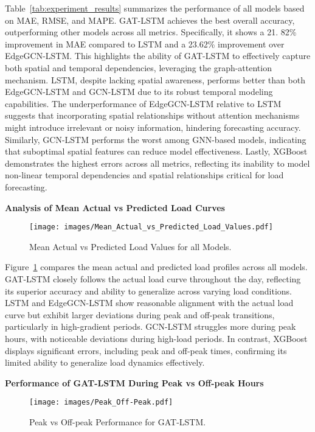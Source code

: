 \documentclass[sigconf,nonacm]{acmart}
\begin{document}
Table~\ref{tab:experiment_results} summarizes the performance of all models based on MAE, RMSE, and MAPE. GAT-LSTM achieves the best overall accuracy, outperforming other models across all metrics. Specifically, it shows a 21. 82\% improvement in MAE compared to LSTM and a 23.62\% improvement over EdgeGCN-LSTM. This highlights the ability of GAT-LSTM to effectively capture both spatial and temporal dependencies, leveraging the graph-attention mechanism. LSTM, despite lacking spatial awareness, performs better than both EdgeGCN-LSTM and GCN-LSTM due to its robust temporal modeling capabilities. The underperformance of EdgeGCN-LSTM relative to LSTM suggests that incorporating spatial relationships without attention mechanisms might introduce irrelevant or noisy information, hindering forecasting accuracy. Similarly, GCN-LSTM performs the worst among GNN-based models, indicating that suboptimal spatial features can reduce model effectiveness. Lastly, XGBoost demonstrates the highest errors across all metrics, reflecting its inability to model non-linear temporal dependencies and spatial relationships critical for load forecasting.



\textbf{Analysis of Mean Actual vs Predicted Load Curves}

\begin{figure}[h!]
    \centering
    \texttt{[image: images/Mean\_Actual\_vs\_Predicted\_Load\_Values.pdf]} 
    \caption{Mean Actual vs Predicted Load Values for all Models.}
    \label{fig:mean_actual_vs_predicted}
\end{figure}

Figure~\ref{fig:mean_actual_vs_predicted} compares the mean actual and predicted load profiles across all models. GAT-LSTM closely follows the actual load curve throughout the day, reflecting its superior accuracy and ability to generalize across varying load conditions. LSTM and EdgeGCN-LSTM show reasonable alignment with the actual load curve but exhibit larger deviations during peak and off-peak transitions, particularly in high-gradient periods. GCN-LSTM struggles more during peak hours, with noticeable deviations during high-load periods. In contrast, XGBoost displays significant errors, including peak and off-peak times, confirming its limited ability to generalize load dynamics effectively.


\textbf{Performance of GAT-LSTM During Peak vs Off-peak Hours}

\begin{figure}[h!]
    \centering
    \texttt{[image: images/Peak\_Off-Peak.pdf]} 
    \caption{Peak vs Off-peak Performance for GAT-LSTM.}
    \label{fig:peak vs off_peak}
\end{figure}
\end{document}
